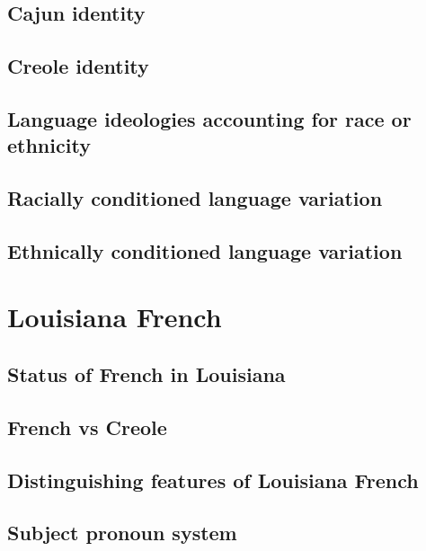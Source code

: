     \subsection{Cajun identity}
    \subsection{Creole identity}
    \subsection{Language ideologies accounting for race or ethnicity}
    \subsection{Racially conditioned language variation}
    \subsection{Ethnically conditioned language variation}
  \section{Louisiana French}
    \subsection{Status of French in Louisiana}
    \subsection{French vs Creole}
    \subsection{Distinguishing features of Louisiana French}
    \subsection{Subject pronoun system}
